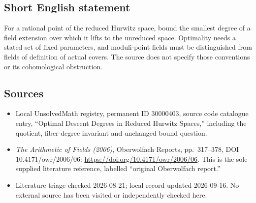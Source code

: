 \documentclass[11pt]{article}
\begin{document}
\subsection{Short English statement}
For a rational point of the reduced Hurwitz space, bound the smallest degree of a field extension over which it lifts to the unreduced space. Optimality needs a stated set of fixed parameters, and moduli-point fields must be distinguished from fields of definition of actual covers. The source does not specify those conventions or its cohomological obstruction.
\subsection{Sources}
\begin{itemize}
\item Local UnsolvedMath registry, permanent ID 30000403, source code catalogue entry, ``Optimal Descent Degrees in Reduced Hurwitz Spaces,'' including the quotient, fiber-degree invariant and unchanged bound question.
\item \emph{The Arithmetic of Fields (2006)}, Oberwolfach Reports, pp.\ 317--378, DOI 10.4171/owr/2006/06: \url{https://doi.org/10.4171/owr/2006/06}. This is the sole supplied literature reference, labelled ``original Oberwolfach report.''
\item Literature triage checked 2026-08-21; local record updated 2026-09-16. No external source has been visited or independently checked here.
\end{itemize}
\end{document}

